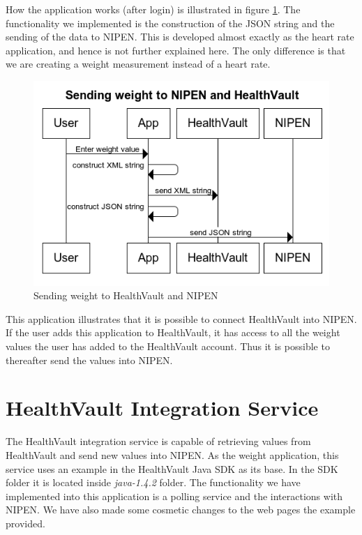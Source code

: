 How the application works (after login) is illustrated in figure \ref{figure:sending-weight-to-healthvault-and-nipen}.
The functionality we implemented is the construction of the JSON string and the sending of the data to NIPEN.
This is developed almost exactly as the heart rate application, and hence is not further explained here.
The only difference is that we are creating a weight measurement instead of a heart rate.

\begin{figure}[h]
\centering
\includegraphics[scale=1.0]{../Figures/sending-weight-to-healthvault-and-nipen.png}
\caption{Sending weight to HealthVault and NIPEN}
\label{figure:sending-weight-to-healthvault-and-nipen}
\end{figure}

This application illustrates that it is possible to connect HealthVault into NIPEN.
If the user adds this application to HealthVault, it has access to all the weight values the user has added to the HealthVault account.
Thus it is possible to thereafter send the values into NIPEN.

\section{HealthVault Integration Service}

The HealthVault integration service is capable of retrieving values from HealthVault and send new values into NIPEN. 
As the weight application, this service uses an example in the HealthVault Java SDK \cite{HealthVaultSDK} as its base.
In the SDK folder it is located inside \textit{java-1.4.2} folder.
The functionality we have implemented into this application is a polling service and the interactions with NIPEN.
We have also made some cosmetic changes to the web pages the example provided.

